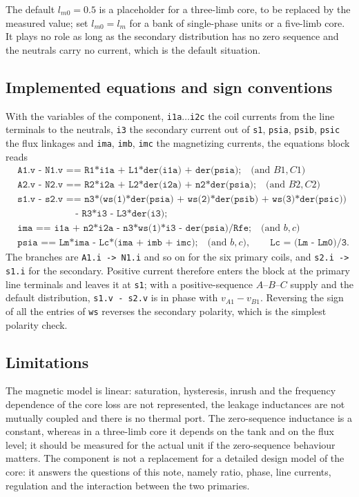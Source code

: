 \documentclass[10pt,a4paper]{scrartcl}
\begin{document}
\begin{onehalfspace}
The default $l_{m0} = 0.5$ is a placeholder for a three-limb core, to be replaced by the measured value; set $l_{m0} = l_m$ for a bank of single-phase units or a five-limb core. It plays no role as long as the secondary distribution has no zero sequence and the neutrals carry no current, which is the default situation.

\subsection{Implemented equations and sign conventions}

With the variables of the component, \texttt{i1a}$\ldots$\texttt{i2c} the coil currents from the line terminals to the neutrals, \texttt{i3} the secondary current out of \texttt{s1}, \texttt{psia}, \texttt{psib}, \texttt{psic} the flux linkages and \texttt{ima}, \texttt{imb}, \texttt{imc} the magnetizing currents, the equations block reads
\begin{align*}
&\texttt{A1.v - N1.v == R1*i1a + L1*der(i1a) + der(psia);} \quad\text{(and } B1, C1\text{)}\\
&\texttt{A2.v - N2.v == R2*i2a + L2*der(i2a) + n2*der(psia);} \quad\text{(and } B2, C2\text{)}\\
&\texttt{s1.v - s2.v == n3*(ws(1)*der(psia) + ws(2)*der(psib) + ws(3)*der(psic))}\\
&\qquad\qquad\qquad\texttt{- R3*i3 - L3*der(i3);}\\
&\texttt{ima == i1a + n2*i2a - n3*ws(1)*i3 - der(psia)/Rfe;} \quad\text{(and } b, c\text{)}\\
&\texttt{psia == Lm*ima - Lc*(ima + imb + imc);} \quad\text{(and } b, c\text{)}, \qquad \texttt{Lc = (Lm - Lm0)/3}.
\end{align*}
The branches are \texttt{A1.i -> N1.i} and so on for the six primary coils, and \texttt{s2.i -> s1.i} for the secondary. Positive current therefore enters the block at the primary line terminals and leaves it at \texttt{s1}; with a positive-sequence $A$--$B$--$C$ supply and the default distribution, \texttt{s1.v - s2.v} is in phase with $v_{A1}-v_{B1}$. Reversing the sign of all the entries of \texttt{ws} reverses the secondary polarity, which is the simplest polarity check.

\subsection{Limitations}

The magnetic model is linear: saturation, hysteresis, inrush and the frequency dependence of the core loss are not represented, the leakage inductances are not mutually coupled and there is no thermal port. The zero-sequence inductance is a constant, whereas in a three-limb core it depends on the tank and on the flux level; it should be measured for the actual unit if the zero-sequence behaviour matters. The component is not a replacement for a detailed design model of the core: it answers the questions of this note, namely ratio, phase, line currents, regulation and the interaction between the two primaries.


\end{onehalfspace}
\end{document}
